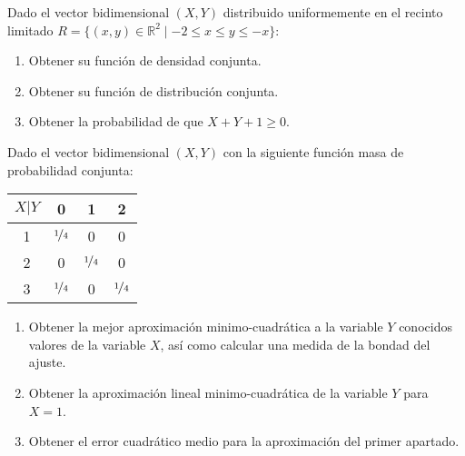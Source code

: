 \documentclass[12pt]{article}
\begin{document}
    \begin{ejercicio}
        Dado el vector bidimensional $(X,Y)$ distribuido uniformemente en el recinto limitado $R = \{(x,y)\in \mathbb{R}^2 \mid -2\leq x \leq y \leq -x\}$:
        \begin{enumerate}
            \item Obtener su función de densidad conjunta.
            \item Obtener su función de distribución conjunta.
            \item Obtener la probabilidad de que $X+Y+1\geq 0$.
        \end{enumerate}
    \end{ejercicio}

    \begin{ejercicio}
        Dado el vector bidimensional $(X,Y)$ con la siguiente función masa de probabilidad conjunta:
        \begin{table}[H]
        \centering
        \begin{tabular}{|c|ccc|}
            \hline
            $X|Y$ & 0 & 1 & 2 \\
            \hline
            1 & $\nicefrac{1}{4}$ & 0 & 0 \\
            2 & 0 & $\nicefrac{1}{4}$ & 0 \\
            3 & $\nicefrac{1}{4}$ & 0 & $\nicefrac{1}{4}$ \\
            \hline
        \end{tabular}
        \end{table}
        \begin{enumerate}
            \item Obtener la mejor aproximación minimo-cuadrática a la variable $Y$ conocidos valores de la variable $X$, así como calcular una medida de la bondad del ajuste.
            \item Obtener la aproximación lineal minimo-cuadrática de la variable $Y$ para $X=1$.
            \item Obtener el error cuadrático medio para la aproximación del primer apartado.
        \end{enumerate}
    \end{ejercicio}
\end{document}
